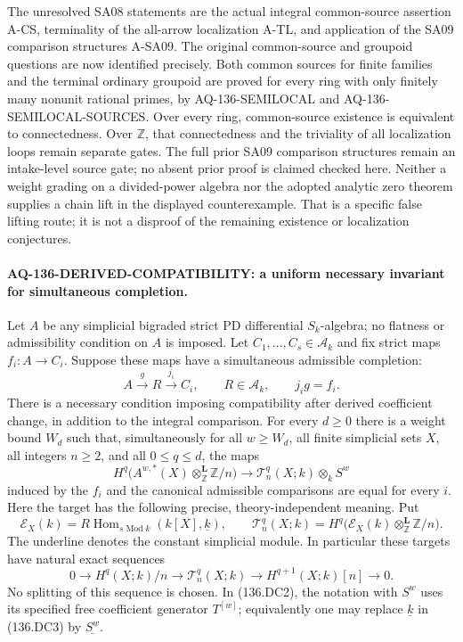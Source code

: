 The unresolved SA08 statements are the actual
integral common-source assertion A-CS, terminality
of the all-arrow localization A-TL, and application
of the SA09 comparison structures A-SA09.
The original common-source and groupoid questions are now
identified precisely. Both common sources for finite families
and the terminal ordinary groupoid are proved for every ring
with only finitely many nonunit rational primes, by
AQ-136-SEMILOCAL and AQ-136-SEMILOCAL-SOURCES. Over every
ring, common-source existence is equivalent to connectedness.
Over $\mathbb Z$, that connectedness and the triviality of
all localization loops remain separate gates. The full prior SA09
comparison structures remain an intake-level source gate;
no absent prior proof is claimed checked here.
Neither a weight grading on a divided-power algebra
nor the adopted analytic zero theorem supplies a
chain lift in the displayed counterexample.
That is a specific false lifting route; it is not
a disproof of the remaining existence or
localization conjectures.




\paragraph{AQ-136-DERIVED-COMPATIBILITY: a uniform necessary invariant for simultaneous completion.}
Let $A$ be any simplicial bigraded strict PD differential
$S_k$-algebra; no flatness or admissibility condition on $A$
is imposed.  Let $C_1,\ldots,C_s\in\mathcal A_k$ and fix
strict maps $f_i:A\to C_i$.  Suppose these maps have a
simultaneous admissible completion:
\[
 A\xrightarrow{g}R\xrightarrow{j_i}C_i,
       \qquad R\in\mathcal A_k,\qquad j_i g=f_i.
                                                               \tag{136.DC1}
\]
There is a necessary condition imposing compatibility
after derived coefficient change, in addition to the
integral comparison.
For every $d\ge0$ there is a weight bound $W_d$ such that,
simultaneously for all $w\ge W_d$, all finite simplicial
sets $X$, all integers $n\ge2$, and all $0\le q\le d$,
the maps
\[
 H^q\bigl(A^{w,*}(X)\otimes^{\mathbf L}_{\mathbb Z}
                         \mathbb Z/n\bigr)
 \longrightarrow \mathcal T^q_n(X;k)\otimes_k S^w
                                                               \tag{136.DC2}
\]
induced by the $f_i$ and the canonical admissible comparisons
are equal for every $i$.  Here the target has the following
precise, theory-independent meaning.  Put
\[
 \mathcal E_X(k)=R\operatorname{Hom}_{s\operatorname{Mod}k}
                         (k[X],\underline{k}),\qquad
 \mathcal T^q_n(X;k)=H^q\bigl(\mathcal E_X(k)
                  \otimes^{\mathbf L}_{\mathbb Z}\mathbb Z/n\bigr).
                                                               \tag{136.DC3}
\]
The underline denotes the constant simplicial module.  In
particular these targets have natural exact sequences
\[
 0\longrightarrow H^q(X;k)/n
 \longrightarrow\mathcal T^q_n(X;k)
 \longrightarrow H^{q+1}(X;k)[n]\longrightarrow0.
                                                               \tag{136.DC4}
\]
No splitting of this sequence is chosen.  In (136.DC2), the
notation with $S^w$ uses its specified free coefficient
generator $T^{[w]}$; equivalently one may replace
$\underline{k}$ in (136.DC3) by $\underline{S^w}$.

